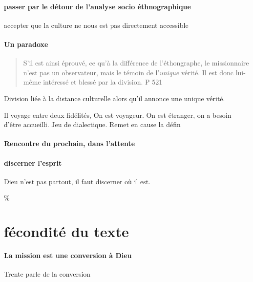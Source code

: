 \paragraph{passer par le détour de l'analyse socio éthnographique} accepter que la culture ne nous est pas directement accessible


\paragraph{Un paradoxe} 

\begin{quote}
    S'il est ainsi éprouvé, ce qu'à la différence de l'éthongraphe, le missionnaire n'est pas un observateur, mais le témoin de l'\textit{unique} vérité. Il est donc lui-même  intéressé et blessé par la division. P 521
\end{quote}
Division liée à la distance culturelle alors qu'il annonce une unique vérité.

Il voyage entre deux fidélités, On est voyageur. On est étranger, on a besoin d'être accueilli. Jeu de dialectique. Remet en cause la défin

\paragraph{Rencontre du prochain, dans l'attente} 

\paragraph{discerner l'esprit} Dieu n'est pas partout, il faut discerner où il est. 

\%%
\section{fécondité du texte}

\paragraph{La mission est une conversion à Dieu} Trente parle de la conversion  

